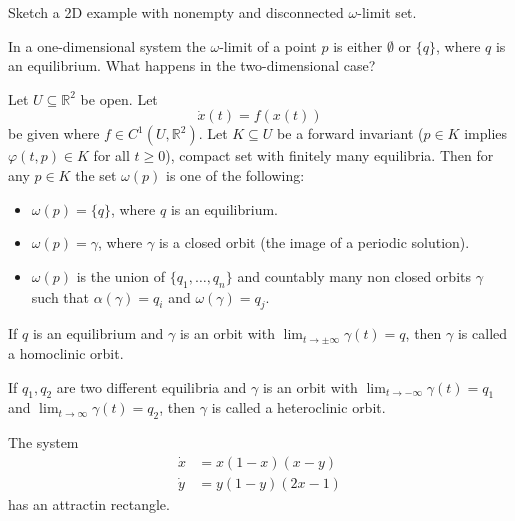 \documentclass{article}
\newcommand*{\R}{\mathbb{R}}
\begin{document}
\begin{hw}
    Sketch a 2D example with nonempty and disconnected $\omega$-limit set.
\end{hw}

In a one-dimensional system the $\omega$-limit of a point $p$ is either $\emptyset$ or $\{q\}$, where $q$ is an equilibrium. What happens in the two-dimensional case?

\begin{thm}
    Let $U \subseteq \R^2$ be open. Let
    $$\dot x(t)=f(x(t))$$
    be given where $f\in C^1(U,\R^2)$. Let $K \subseteq U$ be a forward invariant ($p \in K$ implies $\varphi(t,p)\in K$ for all $t \geq 0$), compact set with finitely many equilibria. Then for any $p \in K$ the set $\omega(p)$ is one of the following:
    \begin{itemize}
        \item $\omega(p) = \{q\}$, where $q$ is an equilibrium.

        \item $\omega(p) = \gamma$, where $\gamma$ is a closed orbit (the image of a periodic solution).

        \item $\omega(p)$ is the union of $\{q_1, \dots ,q_n\}$ and countably many non closed orbits $\gamma$ such that $\alpha(\gamma) = q_i$ and $\omega(\gamma)=q_j$.
    \end{itemize}
\end{thm}

\begin{defin}
    If $q$ is an equilibrium and $\gamma$ is an orbit with $\lim_{t \to \pm\infty}\gamma(t) = q$, then $\gamma$ is called a homoclinic orbit.
\end{defin}

\begin{defin}
    If $q_1, q_2$ are two different equilibria and $\gamma$ is an orbit with $\lim_{t\to-\infty}\gamma(t) = q_1$ and $\lim_{t\to\infty}\gamma(t) = q_2$, then $\gamma$ is called a heteroclinic orbit.
\end{defin}

\begin{exam}
    The system
    $$\begin{aligned}\dot x &= x(1-x)(x-y)\\
    \dot y &= y(1-y)(2x-1)\end{aligned}$$
    has an attractin rectangle.
\end{exam}
\end{document}
